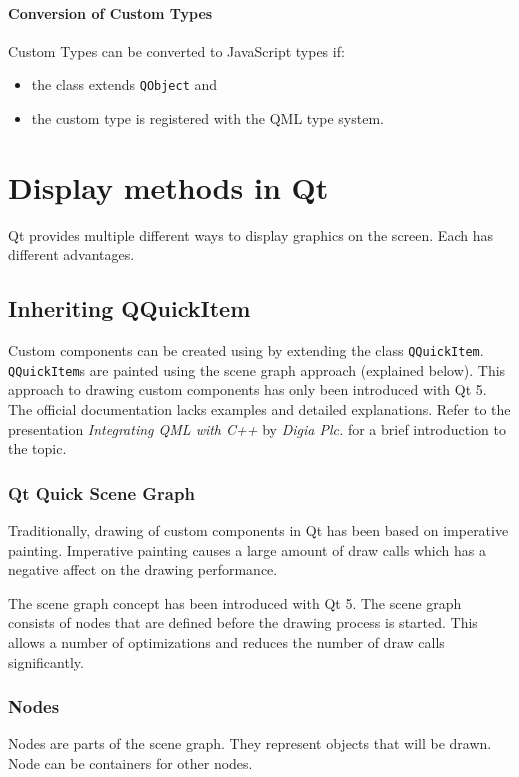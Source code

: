 \paragraph{Conversion of Custom Types}
Custom Types can be converted to JavaScript types if:
\begin {itemize}
	\item {the class extends {\tt QObject} and}
	\item {the custom type is registered with the QML type system.}
\end {itemize}


\section[Display methods in Qt \textsuperscript{Novotny}]{Display methods in Qt}
Qt provides multiple different ways to display graphics on the screen. Each has different advantages.

\subsection{Inheriting QQuickItem}
Custom components can be created using \cpp by extending the class {\tt QQuickItem}.
{\tt QQuickItem}s are painted using the scene graph approach (explained below).
This approach to drawing custom components has only been introduced with Qt 5. The official documentation lacks examples and detailed explanations. Refer to the presentation \textit{Integrating QML with C++} \cite{qtquickpainting1} by \textit{Digia Plc.} for a brief introduction to the topic.
\subsubsection{Qt Quick Scene Graph}
Traditionally, drawing of custom components in Qt has been based on imperative painting. Imperative painting causes a large amount of draw calls which has a negative affect on the drawing performance.

The scene graph concept has been introduced with Qt 5. The scene graph consists of nodes that are defined before the drawing process is started. This allows a number of optimizations and reduces the number of draw calls significantly.

\subsubsection{Nodes}
Nodes are parts of the scene graph. They represent objects that will be drawn. Node can be containers for other nodes. 


